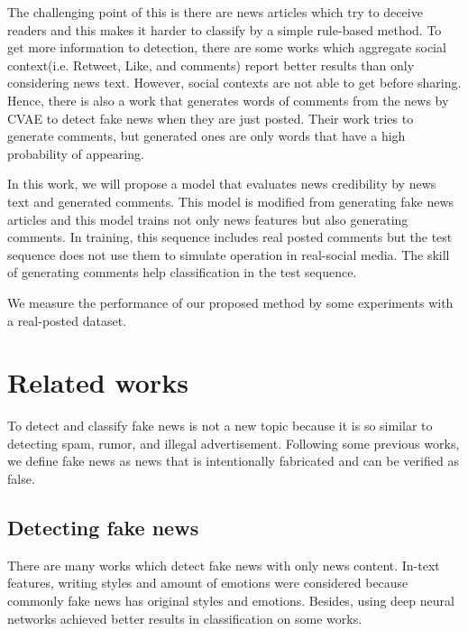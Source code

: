 \documentclass[conference]{IEEEtran}
\begin{document}
The challenging point of this is there are news articles which try to deceive readers
and this makes it harder to classify by a simple rule-based method.
To get more information to detection,
there are some works which aggregate social context(i.e. Retweet, Like, and comments)
report better results than only considering news text\cite{Guo:2018:RDH:3269206.3271709}.
However, social contexts are not able to get before sharing.
Hence, there is also a work that generates words of comments from the news by CVAE to detect fake news when they are just posted\cite{ijcai2018-533}.
Their work tries to generate comments, but generated ones are only words that have a high probability of appearing.

In this work, we will propose a model that evaluates news credibility by news text and generated comments.
This model is modified from generating fake news articles\cite{NIPS2019_9106} and this model trains not only news features but also generating comments.
In training, this sequence includes real posted comments but the test sequence does not use them to simulate operation in real-social media.
The skill of generating comments help classification in the test sequence.

We measure the performance of our proposed method by some experiments with a real-posted dataset.

\section{Related works}
To detect and classify fake news is not a new topic because it is so similar to detecting spam\cite{shen2017discovering}, rumor\cite{7023340}, and illegal advertisement\cite{Huang:2017:DFO:3041021.3054233}.
Following some previous works\cite{Shu:2017:FND:3137597.3137600,Ruchansky:2017:CHD:3132847.3132877,Wang:2018:EEA:3219819.3219903}, we define fake news as news that is intentionally fabricated and can be verified as false.

\subsection{Detecting fake news}
There are many works which detect fake news with only news content.
In-text features, writing styles\cite{DBLP:journals/corr/PotthastKRBS17} and amount of emotions\cite{DBLP:journals/corr/abs-1903-01728}
were considered because commonly fake news has original styles and emotions.
Besides, using deep neural networks achieved better results in classification on some works\cite{wang-2017-liar,karimi-tang-2019-learning,karimi-etal-2018-multi}.
\end{document}
